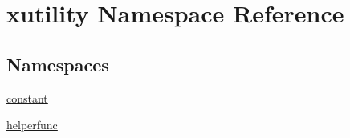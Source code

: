 \hypertarget{namespacexutility}{\section{xutility Namespace Reference}
\label{namespacexutility}
}
\subsection*{Namespaces}
\begin{DoxyCompactItemize}
\item 
\hyperlink{namespacexutility_1_1constant}{constant}
\item 
\hyperlink{namespacexutility_1_1helperfunc}{helperfunc}
\end{DoxyCompactItemize}
